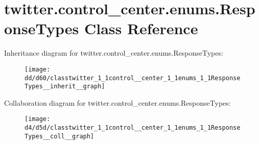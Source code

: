 \hypertarget{classtwitter_1_1control__center_1_1enums_1_1ResponseTypes}{}\section{twitter.\+control\+\_\+center.\+enums.\+Response\+Types Class Reference}
\label{classtwitter_1_1control__center_1_1enums_1_1ResponseTypes}


Inheritance diagram for twitter.\+control\+\_\+center.\+enums.\+Response\+Types\+:\nopagebreak
\begin{figure}[H]
\begin{center}
\leavevmode
\texttt{[image: dd/d60/classtwitter\_1\_1control\_\_center\_1\_1enums\_1\_1ResponseTypes\_\_inherit\_\_graph]}
\end{center}
\end{figure}


Collaboration diagram for twitter.\+control\+\_\+center.\+enums.\+Response\+Types\+:\nopagebreak
\begin{figure}[H]
\begin{center}
\leavevmode
\texttt{[image: d4/d5d/classtwitter\_1\_1control\_\_center\_1\_1enums\_1\_1ResponseTypes\_\_coll\_\_graph]}
\end{center}
\end{figure}
